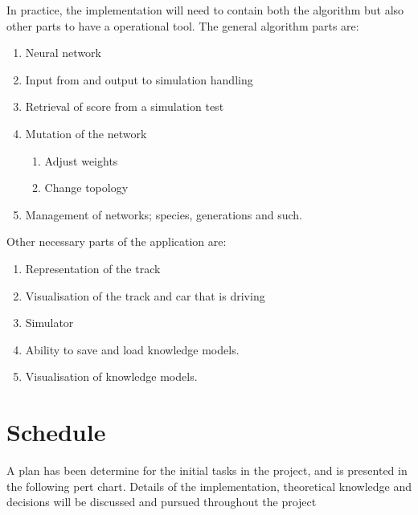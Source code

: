 In practice, the implementation will need to contain both the algorithm but also other parts to have a operational tool. The general algorithm parts are:


\begin{enumerate}
    \item Neural network
    \item Input from and output to simulation handling
    \item Retrieval of score from a simulation test
    \item Mutation of the network
    \begin{enumerate}
        \item Adjust weights
        \item Change topology
    \end{enumerate}
    \item Management of networks; species, generations and such.
\end{enumerate}

Other necessary parts of the application are:

\begin{enumerate}
  \item Representation of the track
  \item Visualisation of the track and car that is driving
  \item Simulator
  \item Ability to save and load knowledge models.
  \item Visualisation of knowledge models.
\end{enumerate}

\section{Schedule}
A plan has been determine for the initial tasks in the project, and is presented in the following pert chart. Details of the implementation, theoretical knowledge and decisions will be discussed and pursued throughout the project

